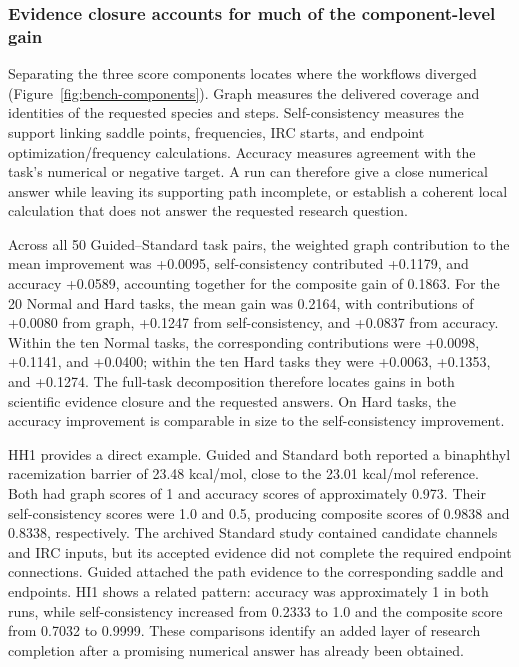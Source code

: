 \subsubsection{Evidence closure accounts for much of the component-level gain}

Separating the three score components locates where the workflows diverged (Figure~\ref{fig:bench-components}). Graph measures the delivered coverage and identities of the requested species and steps. Self-consistency measures the support linking saddle points, frequencies, IRC starts, and endpoint optimization/frequency calculations. Accuracy measures agreement with the task's numerical or negative target. A run can therefore give a close numerical answer while leaving its supporting path incomplete, or establish a coherent local calculation that does not answer the requested research question.

Across all 50 Guided--Standard task pairs, the weighted graph contribution to the mean improvement was +0.0095, self-consistency contributed +0.1179, and accuracy +0.0589, accounting together for the composite gain of 0.1863. For the 20 Normal and Hard tasks, the mean gain was 0.2164, with contributions of +0.0080 from graph, +0.1247 from self-consistency, and +0.0837 from accuracy. Within the ten Normal tasks, the corresponding contributions were +0.0098, +0.1141, and +0.0400; within the ten Hard tasks they were +0.0063, +0.1353, and +0.1274. The full-task decomposition therefore locates gains in both scientific evidence closure and the requested answers. On Hard tasks, the accuracy improvement is comparable in size to the self-consistency improvement.

HH1 provides a direct example. Guided and Standard both reported a binaphthyl racemization barrier of 23.48 kcal/mol, close to the 23.01 kcal/mol reference. Both had graph scores of 1 and accuracy scores of approximately 0.973. Their self-consistency scores were 1.0 and 0.5, producing composite scores of 0.9838 and 0.8338, respectively. The archived Standard study contained candidate channels and IRC inputs, but its accepted evidence did not complete the required endpoint connections. Guided attached the path evidence to the corresponding saddle and endpoints. HI1 shows a related pattern: accuracy was approximately 1 in both runs, while self-consistency increased from 0.2333 to 1.0 and the composite score from 0.7032 to 0.9999. These comparisons identify an added layer of research completion after a promising numerical answer has already been obtained.





